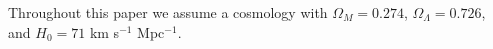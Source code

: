 Throughout this paper we assume a cosmology with $\Omega_M = 0.274$, $\Omega_\Lambda = 0.726$, and $H_0 = 71$ km s$^{-1}$ Mpc$^{-1}$.